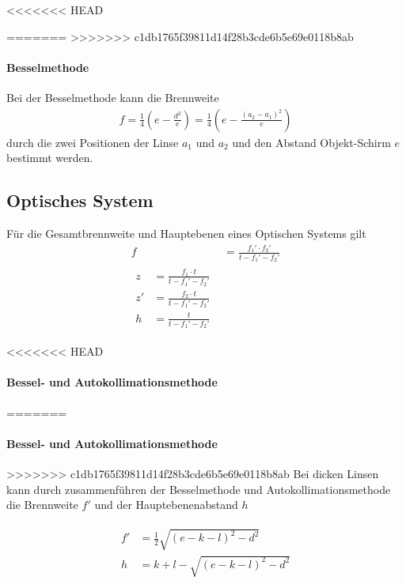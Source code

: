 \documentclass[11pt, a4paper]{article}
\begin{document}
<<<<<<< HEAD

=======
>>>>>>> c1db1765f39811d14f28b3cde6b5e69e0118b8ab
    \paragraph{Besselmethode}
    Bei der Besselmethode kann die Brennweite
    \begin{align}
        f = \frac{1}{4} \left( e - \frac{d^2}{e} \right) = \frac{1}{4} \left( e - \frac{\left(a_2 - a_1\right)^2}{e} \right) \label{eq:bessel}
    \end{align}
    durch die zwei Positionen der Linse $a_1$ und $a_2$ und den Abstand Objekt-Schirm $e$ bestimmt werden.
    
    \subsection{Optisches System}

    Für die Gesamtbrennweite und Hauptebenen eines Optischen Systems gilt
    \begin{align}
        f &= \frac{f_1' \cdot f_2'}{t - f_1' - f_2'} \label{eq:brenn}\\ 
        \begin{split} \label{eq:ebene}
           z &= \frac{f_1 \cdot t}{t - f_1' - f_2'}  \\
           z' &= \frac{f_2 \cdot t}{t - f_1' - f_2'} \\
           h &= \frac{t}{t - f_1' - f_2'}
        \end{split}
    \end{align}

<<<<<<< HEAD

    \paragraph{Bessel- und Autokollimationsmethode}

=======
    \paragraph{Bessel- und Autokollimationsmethode}
>>>>>>> c1db1765f39811d14f28b3cde6b5e69e0118b8ab
    Bei dicken Linsen kann durch zusammenführen der Besselmethode und Autokollimationsmethode die Brennweite $f'$ und der Hauptebenenabstand $h$
    
    \begin{align} \begin{split} \label{eq:dicke}
        f' &= \frac{1}{2} \sqrt{(e-k-l)^2 - d^2} \\
        h &= k + l - \sqrt{(e-k-l)^2 - d^2} \end{split}
    \end{align}
        
\end{document}
